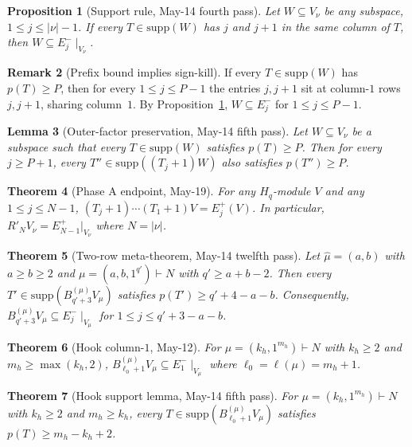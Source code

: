 \documentclass[11pt]{article}
\newtheorem{theorem}{Theorem}
\newtheorem{lemma}[theorem]{Lemma}
\newtheorem{proposition}[theorem]{Proposition}
\theoremstyle{definition}
\newtheorem{remark}[theorem]{Remark}
\newcommand{\Hq}{H_q}
\newcommand{\hatm}{\widehat\mu}
\newcommand{\supp}{\mathrm{supp}}
\newcommand{\Rp}{{R'}}
\begin{document}
\begin{proposition}[Support rule, May-14 fourth pass]\label{prop:support-rule}
Let $W \subseteq V_\nu$ be any subspace, $1 \le j \le |\nu|-1$.
If every $T \in \supp(W)$ has $j$ and $j+1$ in the same column of $T$,
then $W \subseteq E_j^-\!\mid_{V_\nu}$.
\end{proposition}

\begin{remark}[Prefix bound implies sign-kill]\label{rem:prefix-implies-Ej-}
If every $T \in \supp(W)$ has $p(T) \ge P$, then for every
$1 \le j \le P - 1$ the entries $j, j+1$ sit at column-$1$ rows
$j, j+1$, sharing column~$1$.  By Proposition~\ref{prop:support-rule},
$W \subseteq E_j^-$ for $1 \le j \le P - 1$.
\end{remark}

\begin{lemma}[Outer-factor preservation, May-14 fifth pass]\label{lem:outer-preserve}
Let $W \subseteq V_\nu$ be a subspace such that every $T \in \supp(W)$
satisfies $p(T) \ge P$.  Then for every $j \ge P + 1$,
every $T'' \in \supp((T_j{+}1) W)$ also satisfies $p(T'') \ge P$.
\end{lemma}

\begin{theorem}[Phase A endpoint, May-19]\label{thm:phaseA}
For any $\Hq$-module $V$ and any $1 \le j \le N-1$,
$(T_j+1)\cdots(T_1+1) V = E_j^+(V)$.  In particular,
$\Rp_N V_\nu = E_{N-1}^+|_{V_\nu}$ where $N = |\nu|$.
\end{theorem}

\begin{theorem}[Two-row meta-theorem, May-14 twelfth pass]\label{thm:2row-meta}
Let $\hatm = (a, b)$ with $a \ge b \ge 2$ and $\mu = (a, b, 1^{q'})
\vdash N$ with $q' \ge a + b - 2$.  Then every
$T' \in \supp(B^{(\mu)}_{q'+3} V_\mu)$ satisfies
$p(T') \ge q' + 4 - a - b$.  Consequently,
$B^{(\mu)}_{q'+3} V_\mu \subseteq E_j^-\!\mid_{V_\mu}$ for
$1 \le j \le q' + 3 - a - b$.
\end{theorem}

\begin{theorem}[Hook column-$1$, May-12]\label{thm:hook-E1minus}
For $\mu = (k_h, 1^{m_h}) \vdash N$ with $k_h \ge 2$ and $m_h \ge
\max(k_h, 2)$, $B^{(\mu)}_{\ell_0+1} V_\mu \subseteq E_1^-\!\mid_{V_\mu}$
where $\ell_0 = \ell(\mu) = m_h + 1$.
\end{theorem}

\begin{theorem}[Hook support lemma, May-14 fifth pass]\label{thm:hook-support}
For $\mu = (k_h, 1^{m_h}) \vdash N$ with $k_h \ge 2$ and $m_h \ge k_h$,
every $T \in \supp(B^{(\mu)}_{\ell_0+1} V_\mu)$ satisfies
$p(T) \ge m_h - k_h + 2$.
\end{theorem}
\end{document}
